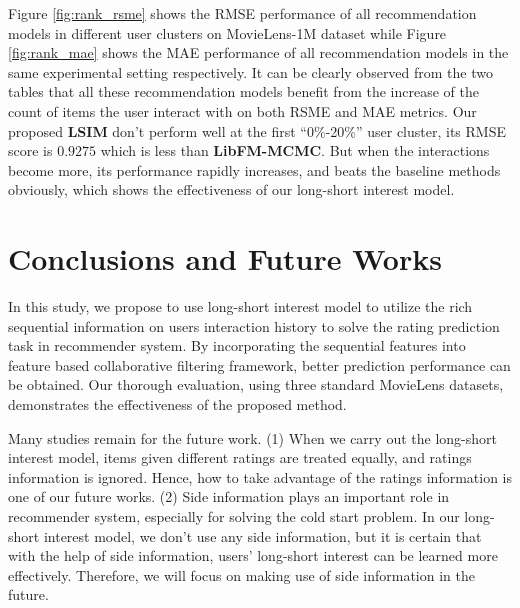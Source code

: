 \documentclass{sig-alternate-05-2015}
\begin{document}
Figure \ref{fig:rank_rsme} shows the RMSE performance of all recommendation models
in different user clusters on MovieLens-1M dataset while Figure \ref{fig:rank_mae}
shows the MAE performance of all recommendation models in the same experimental
setting respectively.
It can be clearly observed from the two tables that all these recommendation models
benefit from the increase of the count of items the user interact with on both
RSME and MAE metrics.
Our proposed \textbf{LSIM} don't perform well at the first ``0\%-20\%'' user cluster,
its RMSE score is $0.9275$ which is less than \textbf{LibFM-MCMC}.
But when the interactions become more, its performance rapidly increases,
and beats the baseline methods obviously, which shows the effectiveness of our
long-short interest model.

\section{Conclusions and Future Works}
In this study, we propose to use long-short interest model to utilize the rich
sequential information on users interaction history to solve the rating
prediction task in recommender system.
By incorporating the sequential features into feature based collaborative
filtering framework, better prediction performance can be obtained.
Our thorough evaluation, using three standard MovieLens datasets, demonstrates
the effectiveness of the proposed method.

Many studies remain for the future work.
(1) When we carry out the long-short interest model, items given different ratings
are treated equally, and ratings information is ignored. Hence, how to take advantage
of the ratings information is one of our future works. 
(2) Side information plays an important role in recommender system, especially
for solving the cold start problem. In our long-short interest model, we don't use
any side information, but it is certain that with the help of side information,
users' long-short interest can be learned more effectively. Therefore, we will focus
on making use of side information in the future.




\end{document}
